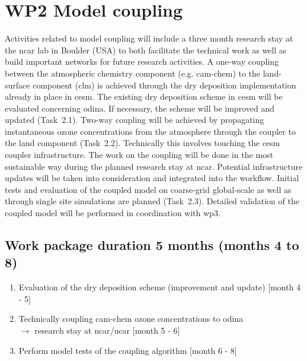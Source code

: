 \section{WP2 Model coupling}
\label{sec:wp2}
Activities related to model coupling will include a three month research stay at the \gls{ncar} lab in Boulder (USA) to both facilitate the technical work as well as build important networks for future research activities. A one-way coupling between the atmospheric chemistry component (e.g. \gls{cam}-chem) to the land-surface component (\gls{clm}) is achieved through the dry deposition implementation already in place in \gls{cesm}. The existing dry deposition scheme in \gls{cesm} will be evaluated concerning \gls{odina}. If necessary, the scheme will be improved and updated (Task~2.1). Two-way coupling will be achieved by propagating instantaneous ozone concentrations from the atmosphere through the coupler to the land component (Task~2.2). Technically this involves touching the \gls{cesm} coupler infrastructure. The work on the coupling will be done in the most sustainable way during the planned research stay at \gls{ncar}. Potential infrastructure updates will be taken into consideration and integrated into the workflow. Initial tests and evaluation of the coupled model on coarse-grid global-scale as well as through single site simulations are planned (Task~2.3). Detailed validation of the coupled model will be performed in coordination with \gls{wp}3.
{
\subsection*{Work package duration 5 months (months 4 to 8)}
\begin{enumerate}[start=1,label={T2.\arabic*}]
  \itemsep0pt
\item Evaluation of the dry deposition scheme (improvement and update) \hfill [month 4 - 5]
\item Technically coupling \gls{cam}-chem ozone concentrations to \gls{odina} \\$\rightarrow$ research stay at \gls{ncar}/\gls{ucar} \hfill [month 5 - 6]
\item Perform model  tests of the coupling algorithm \hfill [month 6 - 8]
\end{enumerate}
}

